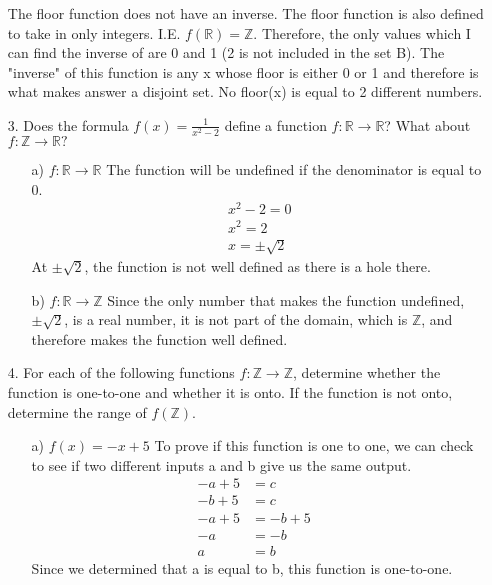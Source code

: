 \documentclass[letterpaper,11pt]{article}
\begin{document}
\begin{enumerate}
\begin{equation}
    \end{equation} 
    The floor function does not have an inverse. The floor function is also defined to take in only integers. I.E. $f(\mathbb{R}) = \mathbb{Z}$. Therefore, the 
    only values which I can find the inverse of are 0 and 1 (2 is not included in the set B). The "inverse" of this function is any x whose floor is either 0 or 1 and therefore is what makes answer a disjoint set. No floor(x) is equal to 2 different numbers. 
    \newpage
    \item[3.] Does the formula $f(x) = \frac{1}{x^2-2}$ define a function $f : \mathbb{R} \to \mathbb{R}$? What about $f : \mathbb{Z} \to \mathbb{R}?$
    \begin{enumerate}
      \item [a)] $f : \mathbb{R} \to \mathbb{R}$
      The function will be undefined if the denominator is equal to 0.
      \begin{equation}
        \begin{aligned}
          &x^2-2 = 0 &\\
          &x^2 = 2 &\\
          & x = \pm \sqrt{2}   
        \end{aligned}
      \end{equation}
      At $\pm \sqrt{2}$, the function is not well defined as there is a hole there.

      \item [b)] $f : \mathbb{R} \to \mathbb{Z}$
      Since the only number that makes the function undefined, $\pm \sqrt{2}$, is a real number, it is not part of the domain, which is $\mathbb{Z}$, and therefore makes the function well defined.
    \end{enumerate}
    \item[4.] For each of the following functions $f : \mathbb{Z} \to \mathbb{Z}$, determine whether the function is one-to-one and whether it is onto. If the function is not onto, determine the range of $f(\mathbb{Z})$.
    \begin{enumerate}
      \item [a)] $f(x) = -x+5$
      To prove if this function is one to one, we can check to see if two different inputs a and b give us the same output.
      \begin{equation}
        \begin{aligned}
          -a+5 &= c &\\
          -b+5 &= c &\\
          -a+5 &= -b+5 &\\
          -a& = -b &\\
          a& = b
        \end{aligned}
      \end{equation}
      Since we determined that a is equal to b, this function is one-to-one.


\end{enumerate}
\end{enumerate}
\end{document}
